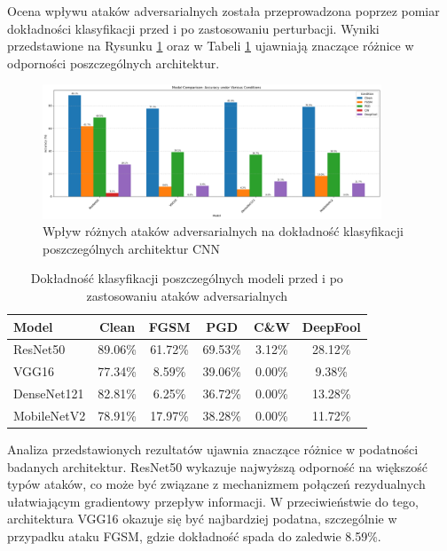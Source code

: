\documentclass[12pt]{article}
\begin{document}
Ocena wpływu ataków adversarialnych została przeprowadzona poprzez pomiar dokładności klasyfikacji przed i po zastosowaniu perturbacji. Wyniki przedstawione na Rysunku \ref{fig:model-comparison} oraz w Tabeli \ref{tab:attack-results} ujawniają znaczące różnice w odporności poszczególnych architektur.
\begin{figure}[H]
    \centering
    \includegraphics[width=0.9\textwidth]{model_comparison.png}
    \caption{Wpływ różnych ataków adversarialnych na dokładność klasyfikacji poszczególnych architektur CNN}
    \label{fig:model-comparison}
\end{figure}

\begin{table}[H]
    \centering
    \begin{tabular}{|l|c|c|c|c|c|}
    \hline
    \textbf{Model} & \textbf{Clean} & \textbf{FGSM} & \textbf{PGD} & \textbf{C\&W} & \textbf{DeepFool} \\
    \hline
    ResNet50 & 89.06\% & 61.72\% & 69.53\% & 3.12\% & 28.12\% \\
    VGG16 & 77.34\% & 8.59\% & 39.06\% & 0.00\% & 9.38\% \\
    DenseNet121 & 82.81\% & 6.25\% & 36.72\% & 0.00\% & 13.28\% \\
    MobileNetV2 & 78.91\% & 17.97\% & 38.28\% & 0.00\% & 11.72\% \\
    \hline
    \end{tabular}
    \caption{Dokładność klasyfikacji poszczególnych modeli przed i po zastosowaniu ataków adversarialnych}
    \label{tab:attack-results}
\end{table}

Analiza przedstawionych rezultatów ujawnia znaczące różnice w podatności badanych architektur. ResNet50 wykazuje najwyższą odporność na większość typów ataków, co może być związane z mechanizmem połączeń rezydualnych ułatwiającym gradientowy przepływ informacji. W przeciwieństwie do tego, architektura VGG16 okazuje się być najbardziej podatna, szczególnie w przypadku ataku FGSM, gdzie dokładność spada do zaledwie 8.59\%.
\end{document}
